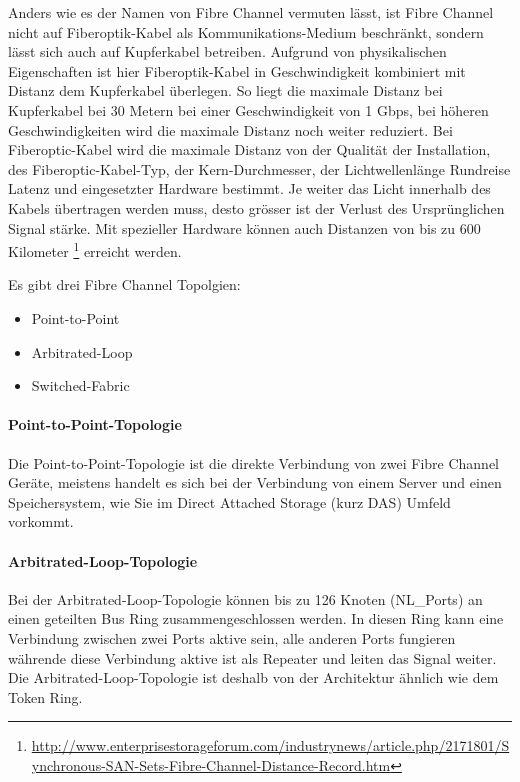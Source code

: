 Anders wie es der Namen von Fibre Channel vermuten lässt, ist Fibre Channel nicht auf Fiberoptik-Kabel als Kommunikations-Medium beschränkt, sondern lässt sich auch auf Kupferkabel betreiben. Aufgrund von physikalischen Eigenschaften ist hier Fiberoptik-Kabel in Geschwindigkeit kombiniert mit Distanz dem Kupferkabel überlegen. So liegt die maximale Distanz bei Kupferkabel bei 30 Metern bei einer Geschwindigkeit von 1 Gbps, bei höheren Geschwindigkeiten wird die maximale Distanz noch weiter reduziert. Bei Fiberoptic-Kabel wird die maximale Distanz von der Qualität der Installation, des Fiberoptic-Kabel-Typ, der Kern-Durchmesser, der Lichtwellenlänge Rundreise Latenz und eingesetzter Hardware bestimmt. Je weiter das Licht innerhalb des Kabels übertragen werden muss, desto grösser ist der Verlust des Ursprünglichen Signal stärke. Mit spezieller Hardware können auch Distanzen von bis zu 600 Kilometer \footnote{\url{http://www.enterprisestorageforum.com/industrynews/article.php/2171801/Synchronous-SAN-Sets-Fibre-Channel-Distance-Record.htm}} erreicht werden.

Es gibt drei Fibre Channel Topolgien:
\begin{itemize}
\item Point-to-Point
\item Arbitrated-Loop
\item Switched-Fabric
\end{itemize}

\paragraph*{Point-to-Point-Topologie}
Die Point-to-Point-Topologie ist die direkte Verbindung von zwei Fibre Channel Geräte, meistens handelt es sich bei der Verbindung von einem Server und einen Speichersystem, wie Sie im Direct Attached Storage (kurz DAS) Umfeld vorkommt. \cite{Christopher2009}

\paragraph*{Arbitrated-Loop-Topologie}
Bei der Arbitrated-Loop-Topologie können bis zu 126 Knoten (NL\_Ports) an einen geteilten Bus Ring zusammengeschlossen werden. In diesen Ring kann eine Verbindung zwischen zwei Ports aktive sein, alle anderen Ports fungieren währende diese Verbindung aktive ist als Repeater und leiten das Signal weiter. Die Arbitrated-Loop-Topologie ist deshalb von der Architektur ähnlich wie dem Token Ring.\cite{Gupta2002}\cite{Christopher2009}

